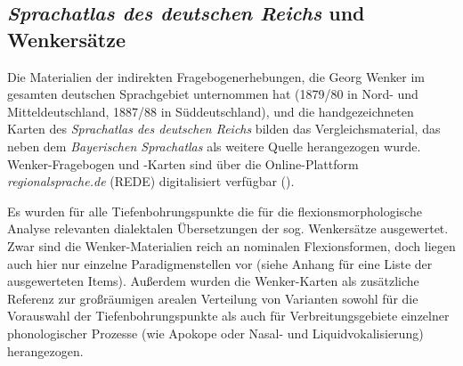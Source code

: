 \subsection{\textit{Sprachatlas des deutschen Reichs} und Wenkersätze}
\label{sec:6.2.2}
Die Materialien der indirekten Fragebogenerhebungen, die Georg Wenker im gesamten deutschen Sprachgebiet unternommen hat (1879/80 in Nord- und Mitteldeutschland, 1887/88 in Süddeutschland), und die handgezeichneten Karten des \textit{Sprachatlas des deutschen Reichs} bilden das Vergleichsmaterial, das neben dem \textit{Bayerischen Sprachatlas} als weitere Quelle herangezogen wurde. Wenker-Fragebogen und -Karten sind über die Online-Plattform \textit{regionalsprache.de} (REDE) digitalisiert verfügbar (\citealt{SchmidtEtAl2008ff}).

Es wurden für alle Tiefenbohrungspunkte die für die flexionsmorphologische Analyse relevanten dialektalen Übersetzungen der sog. Wenkersätze ausgewertet. Zwar sind die Wenker-Materialien reich an nominalen Flexionsformen, doch liegen auch hier nur einzelne Paradigmenstellen vor (siehe Anhang für eine Lis\-te der ausgewerteten Items). Außerdem wurden die Wenker-Karten als zusätzliche Referenz zur großräumigen arealen Verteilung von Varianten sowohl für die Vorauswahl der Tiefenbohrungspunkte als auch für Verbreitungsgebiete einzelner phonologischer Prozesse (wie Apokope oder Nasal- und Liquidvokalisierung) herangezogen.

